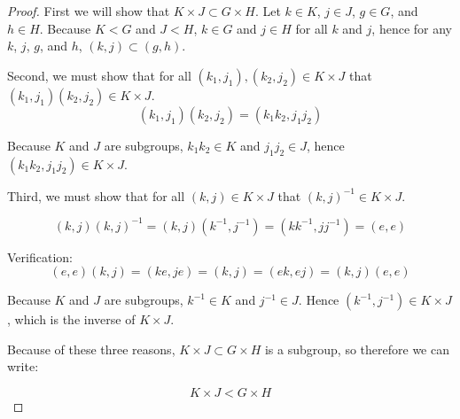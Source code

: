 \documentclass[a4paper]{article}
\begin{document}
\begin{myparindent}{0pt}
\begin{proof}
  First we will show that $K \times J \subset G \times H$. Let $k \in K$,
  $j \in J$, $g \in G$, and $h \in H$. Because $K < G$ and $J < H$, $k \in G$
  and $j \in H$ for all $k$ and $j$, hence for any $k$, $j$, $g$, and $h$,
  $(k, j) \subset (g, h)$. \newline

  Second, we must show that for all $(k_1, j_1), (k_2, j_2) \in K \times J$ that
  $(k_1, j_1)(k_2, j_2) \in K \times J$.
  \[ (k_1, j_1)(k_2, j_2) = (k_1 k_2, j_1 j_2) \]

  Because $K$ and $J$ are subgroups, $k_1 k_2 \in K$ and $j_1 j_2 \in J$, hence
  $(k_1 k_2, j_1 j_2) \in K \times J$.

  Third, we must show that for all $(k, j) \in K \times J$ that
  $(k, j)^{-1} \in K \times J$.

  \[ (k, j)(k, j)^{-1} = (k, j)(k^{-1}, j^{-1}) = (kk^{-1}, jj^{-1}) = (e, e) \]

  Verification:
  \[ (e, e)(k, j) = (ke, je) = (k, j) = (ek, ej) = (k, j)(e, e) \]

  Because $K$ and $J$ are subgroups, $k^{-1} \in K$ and $j^{-1} \in J$.
  Hence $(k^{-1}, j^{-1}) \in K \times J$, which is the inverse of $K \times J$.
  \newline

  Because of these three reasons, $K \times J \subset G \times H$ is a subgroup,
  so therefore we can write:

  \[ K \times J < G \times H \]
\end{proof}

\end{myparindent}
\end{document}
